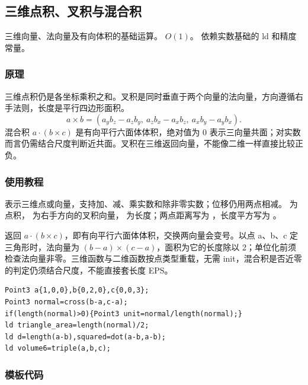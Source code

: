 \subsection{三维点积、叉积与混合积}
\label{geo:point3}
\AlgorithmInfo
    {三维向量、法向量及有向体积的基础运算。}
    {$O(1)$。}
    {依赖实数基础的 ld 和精度常量。}
\subsubsection*{原理}

三维点积仍是各坐标乘积之和。叉积是同时垂直于两个向量的法向量，方向遵循右手法则，长度是平行四边形面积。
\[
 a\times b=(a_yb_z-a_zb_y,\ a_zb_x-a_xb_z,\ a_xb_y-a_yb_x).
\]
混合积 $a\cdot(b\times c)$ 是有向平行六面体体积，绝对值为 0 表示三向量共面；对实数而言仍需结合尺度判断近共面。叉积在三维返回向量，不能像二维一样直接比较正负。

\subsubsection*{使用教程}
 表示三维点或向量，支持加、减、乘实数和除非零实数；位移仍用两点相减。 为点积， 为右手方向的叉积向量， 为长度；两点距离写为 ，长度平方写为 。

 返回 $a\cdot(b\times c)$，即有向平行六面体体积，交换两向量会变号。以点 a、b、c 定三角形时，法向量为 $(b-a)\times(c-a)$，面积为它的长度除以 2；单位化前须检查法向量非零。三维函数与二维函数按点类型重载，无需 init，混合积是否近零的判定仍须结合尺度，不能直接套长度 EPS。
\begin{lstlisting}[style=mtycpp,numbers=none]
Point3 a{1,0,0},b{0,2,0},c{0,0,3};
Point3 normal=cross(b-a,c-a);
if(length(normal)>0){Point3 unit=normal/length(normal);}
ld triangle_area=length(normal)/2;
ld d=length(a-b),squared=dot(a-b,a-b);
ld volume6=triple(a,b,c);
\end{lstlisting}
\subsubsection*{模板代码}
